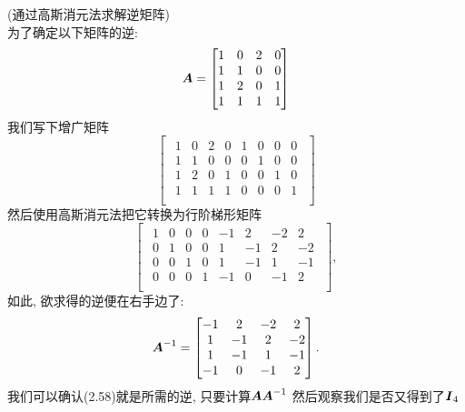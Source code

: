 \begin{example}
    (通过高斯消元法求解逆矩阵)\\
    为了确定以下矩阵的逆:
    \begin{equation}
        \boldsymbol{A} =
        \begin{bmatrix}
            1 & 0 & 2 & 0 \\
            1 & 1 & 0 & 0 \\
            1 & 2 & 0 & 1 \\
            1 & 1 & 1 & 1 \\
        \end{bmatrix}
    \end{equation}
    我们写下增广矩阵
    \[
    \begin{bmatrix}
        \begin{array}{cccc|cccc}
            1 & 0 & 2 & 0 & 1 & 0 & 0 & 0 \\
            1 & 1 & 0 & 0 & 0 & 1 & 0 & 0 \\
            1 & 2 & 0 & 1 & 0 & 0 & 1 & 0 \\
            1 & 1 & 1 & 1 & 0 & 0 & 0 & 1 \\
        \end{array}
    \end{bmatrix}
    \]
    然后使用高斯消元法把它转换为行阶梯形矩阵
    \[
    \begin{bmatrix}
        \begin{array}{cccc|cccc}
            1 & 0 & 0 & 0 & -1 & 2 & -2 & 2 \\
            0 & 1 & 0 & 0 & 1 & -1 & 2 & -2 \\
            0 & 0 & 1 & 0 & 1 & -1 & 1 & -1 \\
            0 & 0 & 0 & 1 & -1 & 0 & -1 & 2 \\
        \end{array}
    \end{bmatrix},
    \]
    如此, 欲求得的逆便在右手边了:
    \begin{equation}
    \boldsymbol{A}^{-1} =
    \begin{bmatrix}
        -1 & 2 & -2 & 2 \\
        1 & -1 & 2 & -2 \\
        1 & -1 & 1 & -1 \\
        -1 & 0 & -1 & 2 \\
    \end{bmatrix}.
    \end{equation}
    我们可以确认(2.58)就是所需的逆, 只要计算$\boldsymbol{AA}^{-1}$
    然后观察我们是否又得到了$\boldsymbol{I}_4$
\end{example}

